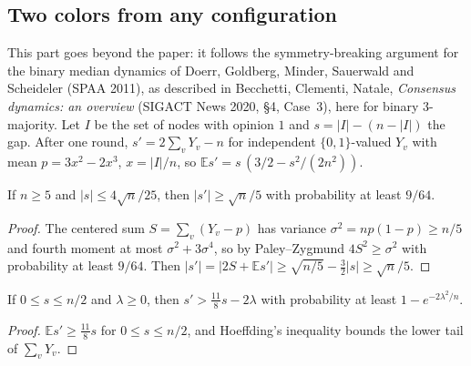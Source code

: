 \subsection{Two colors from any configuration}\label{sec:any_start}

This part goes beyond the paper: it follows the symmetry-breaking argument for the binary
median dynamics of Doerr, Goldberg, Minder, Sauerwald and Scheideler (SPAA 2011), as described in
Becchetti, Clementi, Natale, \emph{Consensus dynamics: an overview} (SIGACT News 2020, \S4,
Case~3), here for binary 3-majority. Let $I$ be the set of nodes with opinion $1$ and
$s = |I| - (n - |I|)$ the gap. After one round, $s' = 2\sum_v Y_v - n$ for independent
$\{0,1\}$-valued $Y_v$ with mean $p = 3x^2 - 2x^3$, $x = |I|/n$, so
$\mathbb{E}s' = s\,(3/2 - s^2/(2n^2))$.

\begin{lemma}\label{lem:jump_near_balance}
  \leanok
  If $n \ge 5$ and $|s| \le 4\sqrt n/25$, then $|s'| \ge \sqrt n/5$ with probability at
  least $9/64$.
\end{lemma}
\begin{proof}
  \leanok
  The centered sum $S = \sum_v (Y_v - p)$ has variance $\sigma^2 = np(1-p) \ge n/5$ and fourth
  moment at most $\sigma^2 + 3\sigma^4$, so by Paley--Zygmund $4S^2 \ge \sigma^2$ with
  probability at least $9/64$. Then $|s'| = |2S + \mathbb{E}s'| \ge \sqrt{n/5} - \frac32|s|
  \ge \sqrt n/5$.
\end{proof}

\begin{lemma}\label{lem:growth_far}
  \leanok
  If $0 \le s \le n/2$ and $\lambda \ge 0$, then $s' > \frac{11}{8}s - 2\lambda$ with
  probability at least $1 - e^{-2\lambda^2/n}$.
\end{lemma}
\begin{proof}
  \leanok
  $\mathbb{E}s' \ge \frac{11}{8}s$ for $0 \le s \le n/2$, and Hoeffding's inequality bounds the
  lower tail of $\sum_v Y_v$.
\end{proof}

